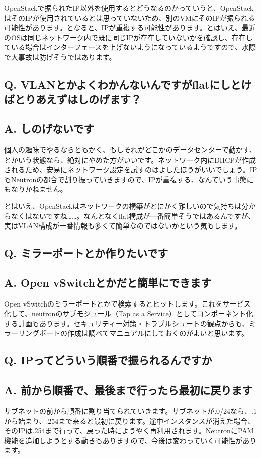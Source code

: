 \documentclass[9pt,b5paper,tombo,openany]{jsbook}
\begin{document}
OpenStackで振られたIP以外を使用するとどうなるのかっていうと、OpenStackはそのIPが使用されているとは思っていないため、別のVMにそのIPが振られる可能性があります。となると、IPが重複する可能性があります。とはいえ、最近のOSは同じネットワーク内で既に同じIPが存在していないかを確認し、存在している場合はインターフェースを上げないようになっているようですので、水際で大事故は防げそうではあります。

\subsection*{{\bfseries Q.} VLANとかよくわかんないんですがflatにしとけばとりあえずはしのげます？}
\subsection*{{\bfseries A.} しのげないです}
個人の趣味でやるならともかく、もしそれがどこかのデータセンターで動かす、とかいう状態なら、絶対にやめた方がいいです。ネットワーク内にDHCPが作成されるため、安易にネットワーク設定を試すのはよしたほうがいいでしょう。IPもNeutronの都合で割り振っていきますので、IPが重複する、なんていう事態にもなりかねません。

とはいえ、OpenStackはネットワークの構築がとにかく難しいので気持ちは分からなくはないですね……。なんとなくflat構成が一番簡単そうではあるんですが、実はVLAN構成が一番情報も多くて簡単なのではないかという気もします。

\subsection*{{\bfseries Q.} ミラーポートとか作りたいです}
\subsection*{{\bfseries A.} Open vSwitchとかだと簡単にできます}
Open vSwitchのミラーポートとかで検索するとヒットします。これをサービス化して、neutronのサブモジュール（Tap as a Service）としてコンポーネント化する計画もあります。セキュリティー対策・トラブルシュートの観点からも、ミラーリングポートの作成は調べてマニュアルにしておくのがよいと思います。

\subsection*{{\bfseries Q.} IPってどういう順番で振られるんですか}
\subsection*{{\bfseries A.} 前から順番で、最後まで行ったら最初に戻ります}
サブネットの前から順番に割り当てられていきます。サブネットが.0/24なら、.1から始まり、.254まで来ると最初に戻ります。途中インスタンスが消えた場合、そのIPは.254まで行って、戻った時にようやく再利用されます。NeutronにPAM機能を追加しようとする動きもありますので、今後は変わっていく可能性があります。
\end{document}

